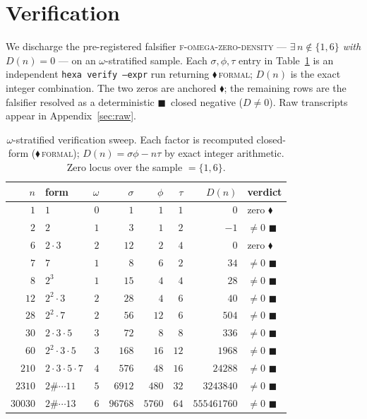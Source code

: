 \documentclass[11pt,a4paper]{article}
\newcommand{\sig}{\sigma}
\newcommand{\formal}{\textcolor{blue!60!black}{$\blacklozenge$}}
\newcommand{\falsi}{\textcolor{red!70!black}{$\blacksquare$}}
\theoremstyle{plain}
\theoremstyle{definition}
\begin{document}
\section{Verification}
\label{sec:verification}

We discharge the pre-registered falsifier \textsc{f-omega-zero-density} ---
\emph{$\exists\,n\notin\{1,6\}$ with $D(n)=0$} --- on an $\omega$-stratified
sample. Each $\sig,\phi,\tau$ entry in Table~\ref{tab:sweep} is an independent
\texttt{hexa verify --expr} run returning \formal\,\textsc{formal}; $D(n)$ is
the exact integer combination. The two zeros are anchored \formal; the
remaining rows are the falsifier resolved as a deterministic \falsi\ closed
negative ($D\neq0$). Raw transcripts appear in Appendix~\ref{sec:raw}.

\begin{table}[h]
\centering
\caption{$\omega$-stratified verification sweep. Each factor is recomputed
closed-form (\formal\,\textsc{formal}); $D(n)=\sig\phi-n\tau$ by exact integer
arithmetic. Zero locus over the sample $=\{1,6\}$.}
\label{tab:sweep}
\begin{tabular}{rlrrrrr l}
\toprule
$n$ & form & $\omega$ & $\sig$ & $\phi$ & $\tau$ & $D(n)$ & verdict\\
\midrule
$1$     & $1$                & $0$ & $1$     & $1$    & $1$  & $0$         & zero \formal\\
$2$     & $2$                & $1$ & $3$     & $1$    & $2$  & $-1$        & $\neq0$ \falsi\\
$6$     & $2\cdot3$          & $2$ & $12$    & $2$    & $4$  & $0$         & zero \formal\\
$7$     & $7$                & $1$ & $8$     & $6$    & $2$  & $34$        & $\neq0$ \falsi\\
$8$     & $2^3$              & $1$ & $15$    & $4$    & $4$  & $28$        & $\neq0$ \falsi\\
$12$    & $2^2\cdot3$        & $2$ & $28$    & $4$    & $6$  & $40$        & $\neq0$ \falsi\\
$28$    & $2^2\cdot7$        & $2$ & $56$    & $12$   & $6$  & $504$       & $\neq0$ \falsi\\
$30$    & $2\cdot3\cdot5$    & $3$ & $72$    & $8$    & $8$  & $336$       & $\neq0$ \falsi\\
$60$    & $2^2\cdot3\cdot5$  & $3$ & $168$   & $16$   & $12$ & $1968$      & $\neq0$ \falsi\\
$210$   & $2\!\cdot\!3\!\cdot\!5\!\cdot\!7$       & $4$ & $576$   & $48$   & $16$ & $24288$     & $\neq0$ \falsi\\
$2310$  & $2\#\cdots11$      & $5$ & $6912$  & $480$  & $32$ & $3243840$   & $\neq0$ \falsi\\
$30030$ & $2\#\cdots13$      & $6$ & $96768$ & $5760$ & $64$ & $555461760$ & $\neq0$ \falsi\\
\bottomrule
\end{tabular}
\end{table}
\end{document}
